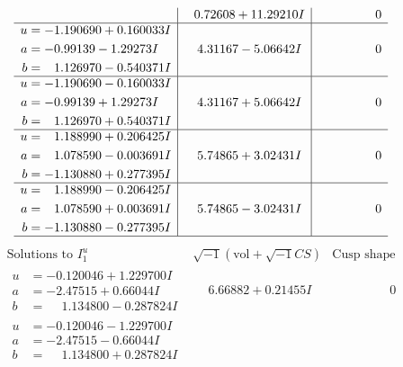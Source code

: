 \documentclass[1p]{elsarticle_modified}
\theoremstyle{definition}
\newcommand{\I}{\sqrt{-1}}
\begin{document}
$$\begin{array}{c|c|c}
 & \phantom{-}0.72608 + 11.29210 I & \phantom{-0.000000 } 0 \\ \hline\begin{aligned}
u &= -1.190690 + 0.160033 I \\
a &= -0.99139 - 1.29273 I \\
b &= \phantom{-}1.126970 - 0.540371 I\end{aligned}
 & \phantom{-}4.31167 - 5.06642 I & \phantom{-0.000000 } 0 \\ \hline\begin{aligned}
u &= -1.190690 - 0.160033 I \\
a &= -0.99139 + 1.29273 I \\
b &= \phantom{-}1.126970 + 0.540371 I\end{aligned}
 & \phantom{-}4.31167 + 5.06642 I & \phantom{-0.000000 } 0 \\ \hline\begin{aligned}
u &= \phantom{-}1.188990 + 0.206425 I \\
a &= \phantom{-}1.078590 - 0.003691 I \\
b &= -1.130880 + 0.277395 I\end{aligned}
 & \phantom{-}5.74865 + 3.02431 I & \phantom{-0.000000 } 0 \\ \hline\begin{aligned}
u &= \phantom{-}1.188990 - 0.206425 I \\
a &= \phantom{-}1.078590 + 0.003691 I \\
b &= -1.130880 - 0.277395 I\end{aligned}
 & \phantom{-}5.74865 - 3.02431 I & \phantom{-0.000000 } 0\\
 \hline 
 \end{array}$$\newpage$$\begin{array}{c|c|c}  
\text{Solutions to }I^u_{1}& \I (\text{vol} + \sqrt{-1}CS) & \text{Cusp shape}\\
 \hline 
\begin{aligned}
u &= -0.120046 + 1.229700 I \\
a &= -2.47515 + 0.66044 I \\
b &= \phantom{-}1.134800 - 0.287824 I\end{aligned}
 & \phantom{-}6.66882 + 0.21455 I & \phantom{-0.000000 } 0 \\ \hline\begin{aligned}
u &= -0.120046 - 1.229700 I \\
a &= -2.47515 - 0.66044 I \\
b &= \phantom{-}1.134800 + 0.287824 I\end{aligned}

\end{array}$$
\end{document}
